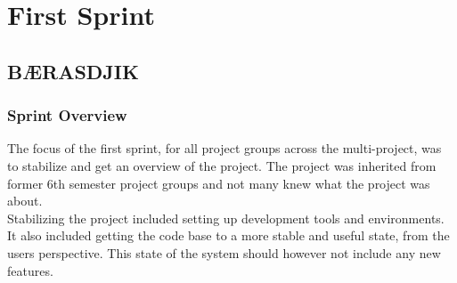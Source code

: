 \part{First Sprint}
\label{par:first_sprint}

\newevenside
\chapter{BÆRASDJIK} %
\label{cha:b_rasdjik}

\section{Sprint Overview}
The focus of the first sprint, for all project groups across the multi-project, was to stabilize and get an overview of the project. The project was inherited from former 6th semester project groups and not many knew what the \giraf project was about.
\\
Stabilizing the project included setting up development tools and environments. It also included getting the code base to a more stable and useful state, from the users perspective. This state of the system should however not include any new features.

